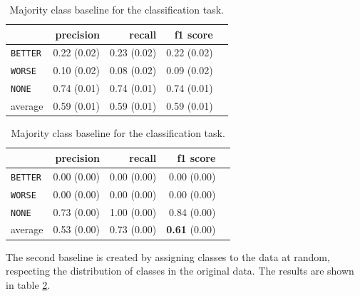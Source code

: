\begin{table}[!htb]
    \begin{minipage}{.5\linewidth}
      \caption{Random (stratified) baseline for the classification task.}
      \label{tbl:3stratifiedbaseline}
      \centering
      
\begin{tabular}{@{}lrrrr@{}}
\toprule
 	&	 precision &	 recall &	 f1 score  \\ \midrule 
\texttt{BETTER}	&	 0.22 \scriptsize{(0.02)} &	 0.23 \scriptsize{(0.02)} &	 0.22 \scriptsize{(0.02)}  \\ 
\texttt{WORSE}	&	 0.10 \scriptsize{(0.02)} &	 0.08 \scriptsize{(0.02)} &	 0.09 \scriptsize{(0.02)}  \\ 
\texttt{NONE}	&	 0.74 \scriptsize{(0.01)} &	 0.74 \scriptsize{(0.01)} &	 0.74 \scriptsize{(0.01)}  \\ 
average	&	 0.59 \scriptsize{(0.01)} &	 0.59 \scriptsize{(0.01)} &	 0.59 \scriptsize{(0.01)}  \\ 
\bottomrule
\end{tabular} 

  \end{minipage}%
    \begin{minipage}{.5\linewidth}
      \centering
        \caption{Majority class baseline for the classification task.}
        \label{tbl:3majoritybaseline}
\begin{tabular}{@{}lrrrr@{}}
\toprule
 	&	 precision &	 recall &	 f1 score  \\ \midrule 
\texttt{BETTER}	&	 0.00 \scriptsize{(0.00)} &	 0.00 \scriptsize{(0.00)} &	 0.00 \scriptsize{(0.00)}  \\ 
\texttt{WORSE}	&	 0.00 \scriptsize{(0.00)} &	 0.00 \scriptsize{(0.00)} &	 0.00 \scriptsize{(0.00)}  \\ 
\texttt{NONE}	&	 0.73 \scriptsize{(0.00)} &	 1.00 \scriptsize{(0.00)} &	 0.84 \scriptsize{(0.00)}  \\ 
average	&	 0.53 \scriptsize{(0.00)} &	 0.73 \scriptsize{(0.00)} &	 \textbf{0.61} \scriptsize{(0.00)}  \\ 
\bottomrule
\end{tabular}
    \end{minipage} 
\end{table}



The second baseline is created by assigning classes to the data at random, respecting the distribution of classes in the original data. The results are shown in table \ref{tbl:3majoritybaseline}.


